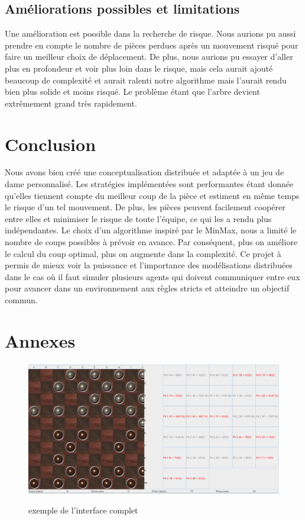 \documentclass[11pt]{article} %
\begin{document}
\subsection{Améliorations possibles et limitations}
Une amélioration est possible dans la recherche de risque. Nous aurions pu aussi prendre en compte le nombre de pièces perdues après un mouvement risqué pour faire un meilleur choix de déplacement.
De plus, nous aurions pu essayer d'aller plus en profondeur et voir plus loin dans le risque, mais cela aurait ajouté beaucoup de complexité et aurait ralenti notre algorithme mais l'aurait rendu bien plus solide et moins risqué. Le problème étant que l'arbre devient extrêmement grand très rapidement.



\section{Conclusion}

Nous avons bien créé une conceptualisation distribuée et adaptée à un jeu de dame personnalisé. Les stratégies implémentées sont performantes étant donnée qu’elles tiennent compte du meilleur coup de la pièce et estiment en même temps le risque d’un tel mouvement. De plus, les pièces peuvent facilement coopérer entre elles et minimiser le risque de toute l’équipe, ce qui les a rendu plus indépendantes.
Le choix d’un algorithme inspiré par le MinMax, nous a limité le nombre de coups possibles à prévoir en avance. Par conséquent, plus on améliore le calcul du coup optimal, plus on augmente dans la complexité.
Ce projet à permis de mieux voir la puissance et l'importance des modélisations distribuées dans le cas où il faut simuler plusieurs agents qui doivent communiquer entre eux pour avancer dans un environnement aux règles stricts et atteindre un objectif commun.

\section{Annexes}
\begin{figure}[!ht]
\caption{exemple de l'interface complet}
\label{fig_sim}
\centering
{
\includegraphics[width=6in]{5}
\label{paysage}
}
\end{figure}
\end{document}
